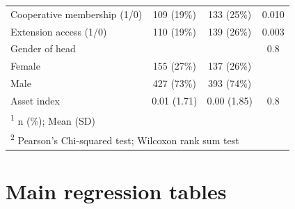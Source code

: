 \documentclass[
]{article}
\begin{document}
\begin{ThreePartTable}
\begin{longtable}[t]{lccc}
Cooperative membership (1/0) & 109 (19\%) & 133 (25\%) & 0.010\\
Extension access (1/0) & 110 (19\%) & 139 (26\%) & 0.003\\
\addlinespace
Gender of head &  &  & 0.8\\
\hspace{1em}Female & 155 (27\%) & 137 (26\%) & \\
\hspace{1em}Male & 427 (73\%) & 393 (74\%) & \\
Asset index & 0.01 (1.71) & 0.00 (1.85) & 0.8\\*
\multicolumn{4}{l}{\rule{0pt}{1em}\textsuperscript{1} n (\%); Mean (SD)}\\
\multicolumn{4}{l}{\rule{0pt}{1em}\textsuperscript{2} Pearson's Chi-squared test; Wilcoxon rank sum test}\\
\end{longtable}
\end{ThreePartTable}
\endgroup{}

\newpage

\hypertarget{main-regression-tables}{%
\section{Main regression tables}\label{main-regression-tables}}

\begingroup\fontsize{7}{9}\selectfont
\end{document}

